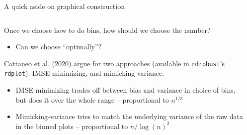 \documentclass[notes,11pt, aspectratio=169]{beamer}
\newenvironment{wideitemize}{\itemize\addtolength{\itemsep}{10pt}}{\enditemize}
\begin{document}
\begin{frame}{A quick aside on graphical construction}
  \begin{columns}[onlytextwidth, T] %
    \begin{column}{.5\textwidth}
      \begin{wideitemize}
      \item Once we choose how to do bins, how should we choose the number?
        \begin{itemize}
        \item Can we choose ``optimally''?
        \end{itemize}
      \item Cattaneo et al. (2020) argue for two approaches (available
        in \texttt{rdrobust}'s \texttt{rdplot}): IMSE-minimizing, and
        mimicking variance.
        \begin{itemize}
        \item IMSE-minimizing trades off between bias and variance in
          choice of bins, but does it over the whole range --
          proportional to $n^{1/3}$
        \item Mimicking-variance tries to match the underlying
          variance of the raw data in the binned plots -- proportional to $n/ \log(n)^{2}$
        \end{itemize}
      \end{wideitemize}
    \end{column}%
    \hfill%
    \begin{column}{.5\textwidth}

\end{column}
\end{columns}
\end{frame}
\end{document}
